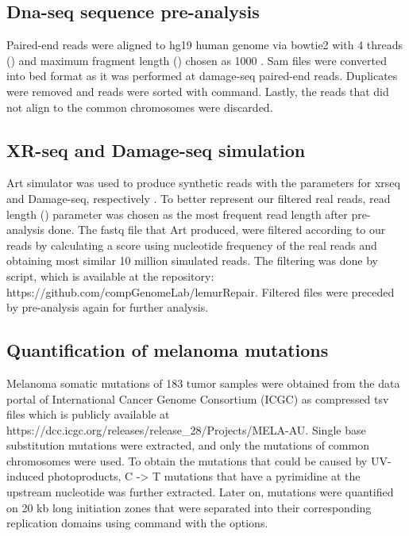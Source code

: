 \subsection{Dna-seq sequence pre-analysis}
Paired-end reads were aligned to hg19 human genome via bowtie2 with 4 threads () and maximum fragment length () chosen as 1000 \citep{langmead2012fast}. Sam files were converted into bed format as it was performed at damage-seq paired-end reads. Duplicates were removed and reads were sorted with  command. Lastly, the reads that did not align to the common chromosomes were discarded.

\subsection{XR-seq and Damage-seq simulation}
Art simulator was used to produce synthetic reads with the parameters
 for \gls{xrseq} and Damage-seq, respectively \citep{huang2012art}. To better represent our filtered real reads, read length () parameter was chosen as the most frequent read length after pre-analysis done. The fastq file that Art produced, were filtered according to our reads by calculating a score using nucleotide frequency of the real reads and obtaining most similar 10 million simulated reads. 
The filtering was done by  script, which is available at the repository: https://github.com/compGenomeLab/lemurRepair. 
Filtered files were preceded by pre-analysis again for further analysis.

\subsection{Quantification of melanoma mutations}
Melanoma somatic mutations of 183 tumor samples were obtained from the data portal of International Cancer Genome Consortium (ICGC) as compressed tsv files which is publicly available at https://dcc.icgc.org/releases/release\_28/Projects/MELA-AU. Single base substitution mutations were extracted, and only the mutations of common chromosomes were used. To obtain the mutations that could be caused by UV-induced photoproducts, C -> T mutations that have a pyrimidine at the upstream nucleotide was further extracted. Later on, mutations were quantified on 20 kb long initiation zones that were separated into their corresponding replication domains using  command with the  options.

